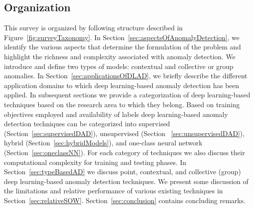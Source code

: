 \subsection{Organization}
This survey is organized by following structure described in Figure~\ref{fig:surveyTaxonomy}.
In Section~\ref{sec:aspectsOfAnomalyDetection}, we identify the various aspects that determine the formulation of the problem and highlight the richness and complexity associated with anomaly detection.
We introduce and define two types of models: contextual and collective or group anomalies. In Section~\ref{sec:applicationsOfDLAD}, we briefly describe the different application domains to which deep learning-based anomaly detection has been applied. In subsequent sections we provide a categorization of deep learning-based techniques based on the research area to which they belong.  Based on training objectives employed and availability of labels  deep learning-based anomaly detection techniques  can be categorized into supervised (Section~\ref{sec:supervisedDAD}), unsupervised (Section ~\ref{sec:unsupervisedDAD}), hybrid (Section~\ref{sec:hybridModels}), and one-class neural network  (Section~\ref{sec:oneclassNN}). For each category of techniques we also discuss their computational complexity for training and testing phases. In Section~\ref{sec:typeBasedAD} we discuss  point, contextual, and collective (group) deep learning-based anomaly detection techniques. We present some discussion of the limitations and relative performance of various existing techniques in Section~\ref{sec:relativeSOW}. Section~\ref{sec:conclusion} contains
concluding remarks.

